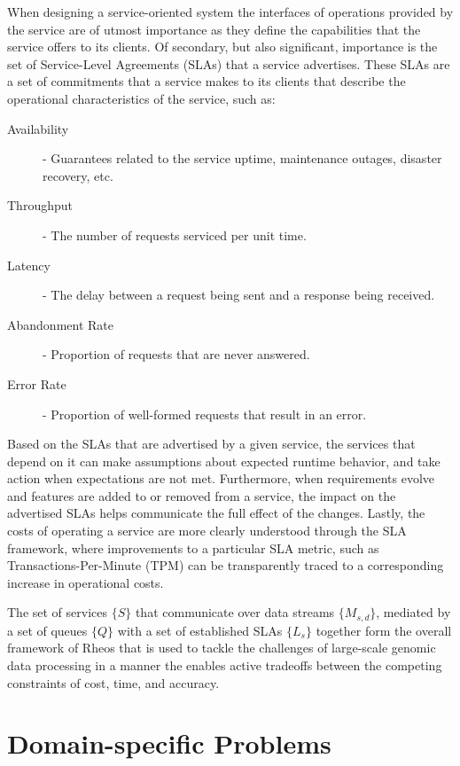 When designing a service-oriented system the interfaces of operations provided by the service are of utmost importance as they define the capabilities that the service offers to its clients. Of secondary, but also significant, importance is the set of Service-Level Agreements (SLAs)\autocite{wieder2011service} that a service advertises. These SLAs are a set of commitments that a service makes to its clients that describe the operational characteristics of the service, such as:

\begin{description}
    \item [Availability] - Guarantees related to the service uptime, maintenance outages, disaster recovery, etc.
    \item [Throughput] - The number of requests serviced per unit time.
    \item [Latency] - The delay between a request being sent and a response being received.
    \item [Abandonment Rate] - Proportion of requests that are never answered.
    \item [Error Rate] - Proportion of well-formed requests that result in an error.
\end{description}

Based on the SLAs that are advertised by a given service, the services that depend on it can make assumptions about expected runtime behavior, and take action when expectations are not met. Furthermore, when requirements evolve and features are added to or removed from a service, the impact on the advertised SLAs helps communicate the full effect of the changes. Lastly, the costs of operating a service are more clearly understood through the SLA framework, where improvements to a particular SLA metric, such as Transactions-Per-Minute (TPM) can be transparently traced to a corresponding increase in operational costs.

The set of services $\{S\}$ that communicate over data streams $\{M_{s,d}\}$, mediated by a set of queues $\{Q\}$ with a set of established SLAs $\{L_s\}$ together form the overall framework of Rheos that is used to tackle the challenges of large-scale genomic data processing in a manner the enables active tradeoffs between the competing constraints of cost, time, and accuracy. 

\section{Domain-specific Problems}

